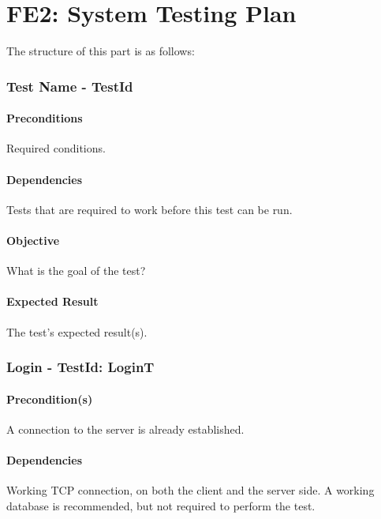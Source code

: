 \documentclass{article}
\begin{document}
\part{FE2: System Testing Plan}

\bigskip The structure of this part is as follows:

\section{Test Name - TestId}

\subsection{Preconditions}

Required conditions.

\subsection{Dependencies}

Tests that are required to work before this test can be run.

\subsection{Objective}

What is the goal of the test?

\subsection{Expected Result}

The test's expected result(s). \newpage

\section{Login - TestId: LoginT}

\subsection{Precondition(s)}

A connection to the server is already established.

\subsection{Dependencies}

Working TCP connection, on both the client and the server side. A working
database is recommended, but not required to perform the test.
\end{document}
